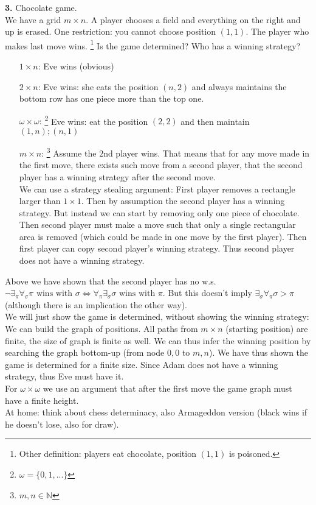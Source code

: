 \noindent
\textbf{3.} Chocolate game.\\
We have a grid $m \times n$. A player chooses a field and everything on the right and up
is erased. One restriction: you cannot choose position $(1, 1)$. The player who makes last
move wins.
\footnote{
Other definition: players eat chocolate, position $(1, 1)$ is poisoned.
}
Is the game determined? Who has a winning strategy?
\begin{itemize}[leftmargin=*,labelindent=12.5mm]
	\item[$1 \times n$:] Eve wins (obvious)
	\item[$2 \times n$:] Eve wins: she eats the position $(n, 2)$ and always maintains
	the bottom row has one piece more than the top one.
	\item[$\omega \times \omega$:]\footnote{$\omega = \{0, 1, ...\}$} Eve wins: eat the position $(2, 2)$ and then maintain $(1, n); (n, 1)$
	\item[$m \times n$:]\footnote{$m, n \in \mathbb{N}$} Assume the $2$nd player wins. That means that for
	any move made in the first move, there exists such move from a second player, that the second player
	has a winning strategy after the second move.\\
	We can use a strategy stealing argument: First player removes a rectangle larger than $1 \times 1$.
	Then by assumption the second player has a winning strategy. But instead we can start by removing
	only one piece of chocolate. Then second player must make a move such that only a single rectangular
	area is removed (which could be made in one move by the first player). Then first player can copy
	second player's winning strategy. Thus second player does not have a winning strategy.\\
\end{itemize}
Above we have shown that the second player has no w.s.\\
$\lnot \exists_{\pi} \forall_{\sigma} \pi \text{ wins with } \sigma \Leftrightarrow \forall_{\pi} \exists_{\sigma} \sigma \text{ wins with } \pi$.
But this doesn't imply $\exists_{\sigma} \forall_{\pi} \sigma > \pi$ (although there is an implication the other way).\\
We will just show the game is determined, without showing the winning strategy:\\
We can build the graph of positions. All paths from $m \times n$ (starting position)
are finite, the size of graph is finite as well. We can thus infer the winning position by
searching the graph bottom-up (from node $0, 0$ to $m, n$). We have thus shown the game is
determined for a finite size. Since Adam does not have a winning strategy, thus Eve must have
it.\\
For $\omega \times \omega$ we use an argument that after the first move the game graph must have
a finite height.\\

At home: think about chess determinacy, also Armageddon version (black wins if he doesn't lose, also for draw).
